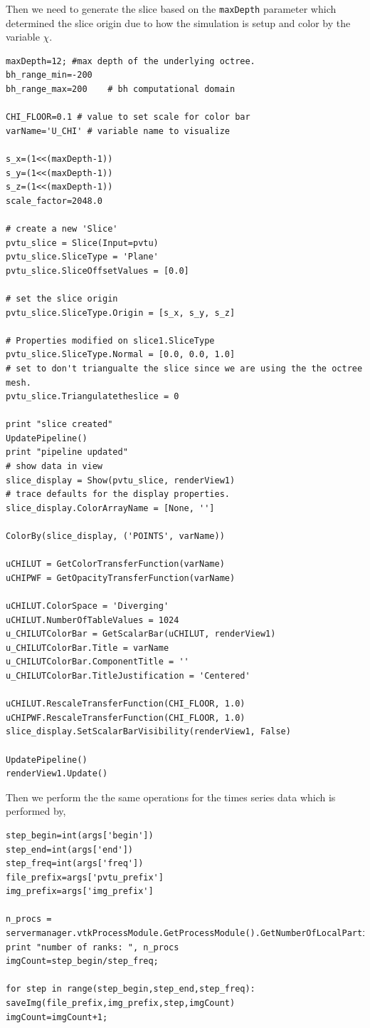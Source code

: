 Then we need to generate the slice based on the \texttt{maxDepth} parameter which determined the slice origin due to how the simulation is setup and color by the variable $\chi$. 

\begin{lstlisting}[basicstyle=\small]
maxDepth=12; #max depth of the underlying octree. 
bh_range_min=-200
bh_range_max=200    # bh computational domain

CHI_FLOOR=0.1 # value to set scale for color bar
varName='U_CHI' # variable name to visualize

s_x=(1<<(maxDepth-1))
s_y=(1<<(maxDepth-1))
s_z=(1<<(maxDepth-1))
scale_factor=2048.0

# create a new 'Slice'
pvtu_slice = Slice(Input=pvtu)
pvtu_slice.SliceType = 'Plane'
pvtu_slice.SliceOffsetValues = [0.0]
  
# set the slice origin
pvtu_slice.SliceType.Origin = [s_x, s_y, s_z]
  
# Properties modified on slice1.SliceType
pvtu_slice.SliceType.Normal = [0.0, 0.0, 1.0]
# set to don't triangualte the slice since we are using the the octree mesh. 
pvtu_slice.Triangulatetheslice = 0
  
print "slice created"
UpdatePipeline()
print "pipeline updated"
# show data in view
slice_display = Show(pvtu_slice, renderView1)
# trace defaults for the display properties.
slice_display.ColorArrayName = [None, '']

ColorBy(slice_display, ('POINTS', varName))
 
uCHILUT = GetColorTransferFunction(varName)
uCHIPWF = GetOpacityTransferFunction(varName)
 
uCHILUT.ColorSpace = 'Diverging'
uCHILUT.NumberOfTableValues = 1024
u_CHILUTColorBar = GetScalarBar(uCHILUT, renderView1)
u_CHILUTColorBar.Title = varName
u_CHILUTColorBar.ComponentTitle = ''
u_CHILUTColorBar.TitleJustification = 'Centered'
 
uCHILUT.RescaleTransferFunction(CHI_FLOOR, 1.0)
uCHIPWF.RescaleTransferFunction(CHI_FLOOR, 1.0)
slice_display.SetScalarBarVisibility(renderView1, False)
 
UpdatePipeline()
renderView1.Update()
\end{lstlisting}

Then we perform the the same operations for the times series data which is performed by,
\begin{lstlisting}[basicstyle=\small]
step_begin=int(args['begin'])
step_end=int(args['end'])
step_freq=int(args['freq'])
file_prefix=args['pvtu_prefix']
img_prefix=args['img_prefix']

n_procs = servermanager.vtkProcessModule.GetProcessModule().GetNumberOfLocalPartitions()
print "number of ranks: ", n_procs
imgCount=step_begin/step_freq;

for step in range(step_begin,step_end,step_freq):
saveImg(file_prefix,img_prefix,step,imgCount)
imgCount=imgCount+1;
\end{lstlisting}

